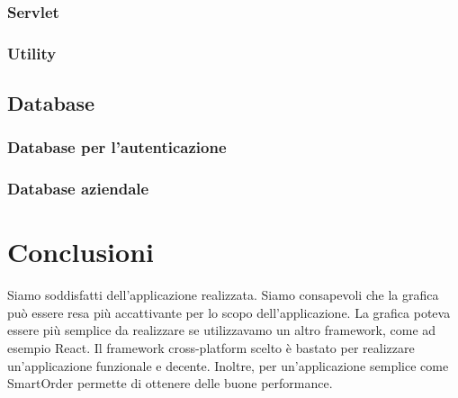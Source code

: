 \documentclass[12pt, a4paper, titlepage]{report}
\begin{document}
	\subsubsection{Servlet}
	
	\subsubsection{Utility}
	
	\subsection{Database}
	
	\subsubsection{Database per l'autenticazione}
	
	\subsubsection{Database aziendale}
	
	\section{Conclusioni}
	Siamo soddisfatti dell'applicazione realizzata. Siamo consapevoli che la grafica può essere resa più accattivante per lo scopo dell'applicazione. La grafica poteva essere più semplice da realizzare se utilizzavamo un altro framework, come ad esempio React. 
	Il framework cross-platform scelto è bastato per realizzare un'applicazione funzionale e decente. Inoltre, per un'applicazione semplice come SmartOrder permette di ottenere delle buone performance.
\end{document}
